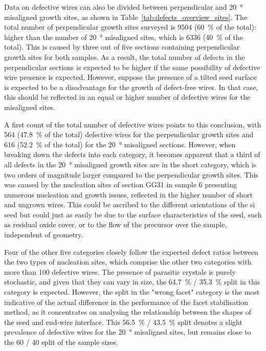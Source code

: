 Data on defective wires can also be divided between perpendicular and \qty{20}{\degree} misaligned growth sites, as shown in Table~\ref{tab:defects_overview_sites}. The total number of perpendicular growth sites surveyed is \num{9504} (\qty{60}{\%} of the total): higher than the number of \qty{20}{\degree} misaligned sites, which is \num{6336} (\qty{40}{\%} of the total). This is caused by three out of five sections containing perpendicular growth sites for both samples. As a result, the total number of defects in the perpendicular sections is expected to be higher if the same possibility of defective wire presence is expected. However, suppose the presence of a tilted seed surface is expected to be a disadvantage for the growth of defect-free wires. In that case, this should be reflected in an equal or higher number of defective wires for the misaligned sites.

A first count of the total number of defective wires points to this conclusion, with \num{564} (\qty{47.8}{\%} of the total) defective wires for the perpendicular growth sites and \num{616} (\qty{52.2}{\%} of the total) for the \qty{20}{\degree} misaligned sections. However, when breaking down the defects into each category, it becomes apparent that a third of all defects in the \qty{20}{\degree} misaligned growth sites are in the short category, which is two orders of magnitude larger compared to the perpendicular growth sites. This was caused by the nucleation sites of section GG31 in sample 6 presenting numerous nucleation and growth issues, reflected in the higher number of short and ungrown wires. This could be ascribed to the different orientations of the \acl{si} seed but could just as easily be due to the surface characteristics of the seed, such as residual oxide cover, or to the flow of the precursor over the sample, independent of geometry.

Four of the other five categories closely follow the expected defect ratios between the two types of nucleation sites, which comprise the other two categories with more than \num{100} defective wires. The presence of parasitic crystals is purely stochastic, and given that they can vary in size, the \qty{64.7}{\%} / \qty{35.3}{\%} split in this category is expected. However, the split in the "wrong facet" category is the most indicative of the actual difference in the performance of the facet stabilisation method, as it concentrates on analysing the relationship between the shapes of the seed and end-wire interface. This \qty{56.5}{\%} / \qty{43.5}{\%} split denotes a slight prevalence of defective wires for the \qty{20}{\degree} misaligned sites, but remains close to the \num{60} / \num{40} split of the sample sizes.

